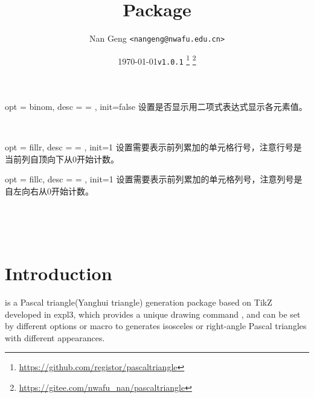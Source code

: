 \documentclass[full]{l3doc}
\def\vers{\texttt{v1.0.1}
\thanks{\url{https://github.com/registor/pascaltriangle}}
\thanks{\url{https://gitee.com/nwafu_nan/pascaltriangle}}
}
\begin{document}
\begin{documentation}
\bigskip

\begin{option}{opt = binom, desc = {= }, init=false}
  设置是否显示用二项式表达式显示各元素值。
\end{option}\\
\begin{SideBySideExample}[frame=single,numbers=left,xrightmargin=.63\linewidth,gobble=2]
  \centering
\end{SideBySideExample}

\bigskip

\begin{option}{ opt = fillr, desc = {= }, init=1 }
  设置需要表示前列累加的单元格行号，注意行号是当前列自顶向下从0开始计数。
\end{option}

\begin{option}{ opt = fillc, desc = {= }, init=1 }
  设置需要表示前列累加的单元格列号，注意列号是自左向右从0开始计数。
\end{option}\\
\begin{SideBySideExample}[frame=single,numbers=left,xrightmargin=.64\linewidth,gobble=2]
  \centering
  \\
\end{SideBySideExample}

\bigskip

\title{
  Package 
}
\author{Nan Geng \texttt{<nangeng@nwafu.edu.cn>}}
\date{\today\qquad \vers}
\maketitle

\section{Introduction}

 is a Pascal triangle(Yanghui triangle) generation package
based on TikZ developed in expl3, which provides a unique drawing command ,
and can be set by different options or  macro to
generates isosceles or right-angle Pascal triangles with different appearances.


\end{documentation}
\end{document}
